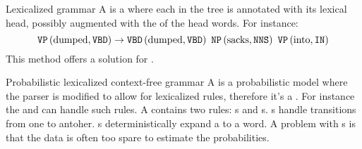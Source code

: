 \begin{df}{Lexicalized grammar}
A \sb{} is a  where each  in the tree is annotated with its lexical head, possibly augmented with the  of the head words. For instance:
\begin{equation}
\fun{\tagref{VP}}{\mbox{dumped},\tagref{VBD}}\rightarrow\fun{\tagref{VBD}}{\mbox{dumped},\tagref{VBD}}\ \fun{\tagref{NP}}{\mbox{sacks},\tagref{NNS}}\ \fun{\tagref{VP}}{\mbox{into},\tagref{IN}}
\end{equation}
This method offers a solution for .
\end{df}
\begin{df}[PLCFG]{Probabilistic lexicalized context-free grammar}
A \sb{} is a probabilistic model where the parser is modified to allow for lexicalized rules, therefore it's a . For instance the  and  can handle such rules. A \sb{} contains two rules: s and s. s handle transitions from one  to antoher. s deterministically expand a  to a word. A problem with \sb{}s is that the data is often too spare to estimate the probabilities.
\end{df}
